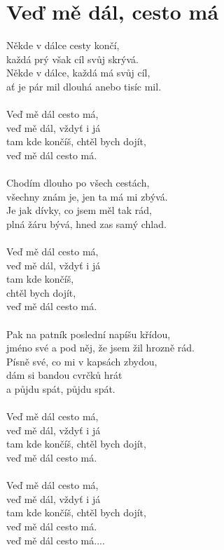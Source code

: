 \section{Veď mě dál, cesto má}
Někde v dálce cesty končí,\\
každá prý však cíl svůj skrývá.\\
Někde v dálce, každá má svůj cíl,\\
ať je pár mil dlouhá anebo tisíc mil.\\
\\
Veď mě dál cesto má,\\
veď mě dál, vždyť i já\\
tam kde končíš, chtěl bych dojít,\\
veď mě dál cesto má.\\
\\
Chodím dlouho po všech cestách,\\
všechny znám je, jen ta má mi zbývá.\\
Je jak dívky, co jsem měl tak rád,\\
plná žáru bývá, hned zas samý chlad.\\
\\
Veď mě dál cesto má,\\
veď mě dál, vždyť i já\\
tam kde končíš, \\
chtěl bych dojít,\\
veď mě dál cesto má.\\
\\
Pak na patník poslední napíšu křídou,\\
jméno své a pod něj, že jsem žil hrozně rád.\\
Písně své, co mi v kapsách zbydou,\\
dám si bandou cvrčků hrát\\
a půjdu spát, půjdu spát.\\
\\
Veď mě dál cesto má,\\
veď mě dál, vždyť i já\\
tam kde končíš, chtěl bych dojít,\\
veď mě dál cesto má.\\
\\
Veď mě dál cesto má,\\
veď mě dál, vždyť i já\\
tam kde končíš, chtěl bych dojít,\\
veď mě dál cesto má.\\
veď mě dál cesto má....